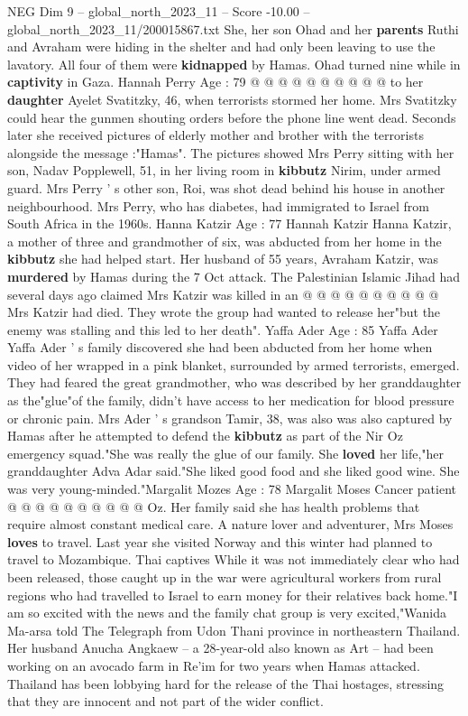 \begin{textsample}{NEG Dim 9 – global\_north\_2023\_11 – Score -10.00 – global\_north\_2023\_11/200015867.txt}
She, her son Ohad and her \textbf{parents} Ruthi and Avraham were hiding in the shelter and had only been leaving to use the lavatory.
All four of them were \textbf{kidnapped} by Hamas.
Ohad turned nine while in \textbf{captivity} in Gaza.
Hannah Perry Age : 79 @ @ @ @ @ @ @ @ @ @ to her \textbf{daughter} Ayelet Svatitzky, 46, when terrorists stormed her home.
Mrs Svatitzky could hear the gunmen shouting orders before the phone line went dead.
Seconds later she received pictures of elderly mother and brother with the terrorists alongside the message :"Hamas".
The pictures showed Mrs Perry sitting with her son, Nadav Popplewell, 51, in her living room in \textbf{kibbutz} Nirim, under armed guard.
Mrs Perry ' s other son, Roi, was shot dead behind his house in another neighbourhood.
Mrs Perry, who has diabetes, had immigrated to Israel from South Africa in the 1960s.
Hanna Katzir Age : 77 Hannah Katzir Hanna Katzir, a mother of three and grandmother of six, was abducted from her home in the \textbf{kibbutz} she had helped start.
Her husband of 55 years, Avraham Katzir, was \textbf{murdered} by Hamas during the 7 Oct attack.
The Palestinian Islamic Jihad had several days ago claimed Mrs Katzir was killed in an @ @ @ @ @ @ @ @ @ @ Mrs Katzir had died.
They wrote the group had wanted to release her"but the enemy was stalling and this led to her death".
Yaffa Ader Age : 85 Yaffa Ader Yaffa Ader ' s family discovered she had been abducted from her home when video of her wrapped in a pink blanket, surrounded by armed terrorists, emerged.
They had feared the great grandmother, who was described by her granddaughter as the"glue"of the family, didn't have access to her medication for blood pressure or chronic pain.
Mrs Ader ' s grandson Tamir, 38, was also was also captured by Hamas after he attempted to defend the \textbf{kibbutz} as part of the Nir Oz emergency squad."She was really the glue of our family.
She \textbf{loved} her life,"her granddaughter Adva Adar said."She liked good food and she liked good wine.
She was very young-minded."Margalit Mozes Age : 78 Margalit Moses Cancer patient @ @ @ @ @ @ @ @ @ @ Oz.
Her family said she has health problems that require almost constant medical care.
A nature lover and adventurer, Mrs Moses \textbf{loves} to travel.
Last year she visited Norway and this winter had planned to travel to Mozambique.
Thai captives While it was not immediately clear who had been released, those caught up in the war were agricultural workers from rural regions who had travelled to Israel to earn money for their relatives back home."I am so excited with the news and the family chat group is very excited,"Wanida Ma-arsa told The Telegraph from Udon Thani province in northeastern Thailand.
Her husband Anucha Angkaew -- a 28-year-old also known as Art -- had been working on an avocado farm in Re'im for two years when Hamas attacked.
Thailand has been lobbying hard for the release of the Thai hostages, stressing that they are innocent and not part of the wider conflict.

\end{textsample}

